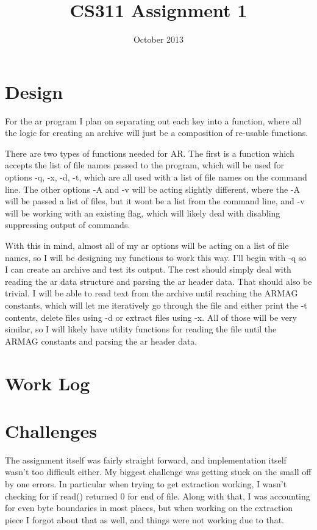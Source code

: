 \documentclass[letterpaper,10pt]{article}
\title{CS311 Assignment 1}
\author{\name}
\date{October 2013}
\begin{document}
\maketitle

\section{Design}

For the ar program I plan on separating out each key into a function, where all
the logic for creating an archive will just be a composition of re-usable
functions.

There are two types of functions needed for AR. The first is a function which
accepts the list of file names passed to the program, which will be used for
options -q, -x, -d, -t, which are all used with a list of file names on the
command line. The other options -A and -v will be acting slightly different,
where the -A will be passed a list of files, but it wont be a list from the
command line, and -v will be working with an existing flag, which will likely
deal with disabling suppressing output of commands.

With this in mind, almost all of my ar options will be acting on a list of file
names, so I will be designing my functions to work this way. I'll begin with -q
so I can create an archive and test its output. The rest should simply deal
with reading the ar data structure and parsing the ar header data. That should
also be trivial. I will be able to read text from the archive until reaching
the ARMAG constants, which will let me iteratively go through the file and
either print the -t contents, delete files using -d or extract files using -x.
All of those will be very similar, so I will likely have utility functions for
reading the file until the ARMAG constants and parsing the ar header data.

\section{Work Log}

\section{Challenges}
The assignment itself was fairly straight forward, and implementation itself
wasn't too difficult either. My biggest challenge was getting stuck on the
small off by one errors. In particular when trying to get extraction working, I
wasn't checking for if read() returned 0 for end of file. Along with that, I
was accounting for even byte boundaries in most places, but when working on the
extraction piece I forgot about that as well, and things were not working due
to that.
\end{document}
